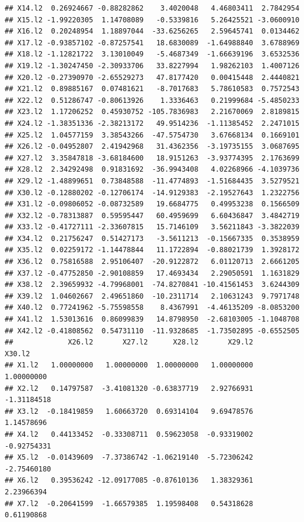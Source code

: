 \documentclass[]{article}
\begin{document}
\begin{verbatim}
## X14.l2  0.26924667 -0.88282862    3.4020048   4.46803411  2.7842954
## X15.l2 -1.99220305  1.14708089   -0.5339816   5.26425521 -3.0600910
## X16.l2  0.20248954  1.18897044  -33.6256265   2.59645741  0.0134462
## X17.l2 -0.93857102 -0.87257541   18.6830089  -1.64988840  3.6788969
## X18.l2 -1.12821722  3.13010049   -5.4687349  -1.66639196  3.6532536
## X19.l2 -1.30247450 -2.30933706   33.8227994   1.98262103  1.4007126
## X20.l2 -0.27390970 -2.65529273   47.8177420   0.00415448  2.4440821
## X21.l2  0.89885167  0.07481621   -8.7017683   5.78610583  0.7572543
## X22.l2  0.51286747 -0.80613926    1.3336463   0.21999684 -5.4850233
## X23.l2  1.17206252  0.45930752 -105.7836983   2.21670069  2.8189815
## X24.l2 -1.38351336 -2.38213172   49.9514236  -1.11385452  2.2471015
## X25.l2  1.04577159  3.38543266  -47.5754730   3.67668134  0.1669101
## X26.l2 -0.04952807  2.41942968   31.4362356  -3.19735155  3.0687695
## X27.l2  3.35847818 -3.68184600   18.9151263  -3.93774395  2.1763699
## X28.l2  2.34292498  0.91831692  -36.9943408   4.02268966 -4.1039736
## X29.l2 -1.48899651  0.73848588  -11.4774893  -1.51684435  3.5279521
## X30.l2 -0.12880202 -0.12706174  -14.9129383  -2.19527643  1.2322756
## X31.l2 -0.09806052 -0.08732589   19.6684775   0.49953238  0.1566509
## X32.l2 -0.78313887  0.59595447   60.4959699   6.60436847  3.4842719
## X33.l2 -0.41727111 -2.33607815   15.7146109   3.56211843 -3.3822039
## X34.l2  0.21756247  0.51427173   -3.5611213  -0.15667335  0.3538959
## X35.l2  0.02259172 -1.14478844   11.1722894  -0.88021739  1.3928172
## X36.l2  0.75816588  2.95106407  -20.9122872   6.01120713  2.6661205
## X37.l2 -0.47752850 -2.90108859   17.4693434   2.29050591  1.1631829
## X38.l2  2.39659932 -4.79968001  -74.8270841 -10.41561453  3.6244309
## X39.l2  1.04602667  2.49651860  -10.2311714   2.10631243  9.7971748
## X40.l2  0.77241962 -5.75598558    8.4367991  -4.46135209 -8.0853200
## X41.l2  1.53013616  0.86099839   14.8798950  -2.68103005 -1.1048708
## X42.l2 -0.41808562  0.54731110  -11.9328685  -1.73502895 -0.6552505
##             X26.l2       X27.l2      X28.l2       X29.l2      X30.l2
## X1.l2   1.00000000   1.00000000  1.00000000   1.00000000  1.00000000
## X2.l2   0.14797587  -3.41081320 -0.63837719   2.92766931 -1.31184518
## X3.l2  -0.18419859   1.60663720  0.69314104   9.69478576  1.14578696
## X4.l2   0.44133452  -0.33308711  0.59623058  -0.93319002 -0.92754331
## X5.l2  -0.01439609  -7.37386742 -1.06219140  -5.72306242 -2.75460180
## X6.l2   0.39536242 -12.09177085 -0.87610136   1.38329361  2.23966394
## X7.l2  -0.20641599  -1.66579385  1.19598408   0.54318628  0.61190868

\end{verbatim}
\end{document}
